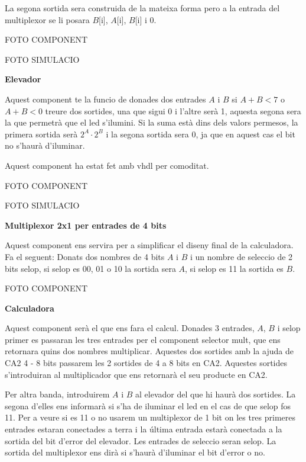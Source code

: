 \documentclass[12pt, a4papre]{article}
\begin{document}
	La segona sortida sera construida de la mateixa forma pero a la entrada del multiplexor se li posara $B$[i], $A$[i], $B$[i] i 0.
	
	\begin{center}
		FOTO COMPONENT
		
		FOTO SIMULACIO
	\end{center}
	
	\textbf{\large{Elevador}}
	
	Aquest component te la funcio de donades dos entrades $A$ i $B$ si $A + B < 7$ o $A + B  < 0$ treure dos sortides, una que sigui 0 i l'altre serà 1, aquesta segona sera la que permetrà que el led s'ilumini. Si la suma està dins dels valors permesos, la primera sortida serà $2^A\cdot2^B$ i la segona sortida sera 0, ja que en aquest cas el bit no s'haurà d'iluminar.
	
	Aquest component ha estat fet amb vhdl per comoditat.
	
	\begin{center}
		FOTO COMPONENT
		
		FOTO SIMULACIO
	\end{center}
	
	\textbf{\large{Multiplexor 2x1 per entrades de 4 bits}}
	
	Aquest component ens servira per a simplificar el diseny final de la calculadora. Fa el seguent: Donats dos nombres de 4 bits $A$ i $B$ i un nombre de seleccio de 2 bits selop, si selop es 00, 01 o 10 la sortida sera $A$, si selop es 11 la sortida es $B$.
	
	\begin{center}
		FOTO COMPONENT
	\end{center}
	
	\textbf{\large{Calculadora}}
	
	Aquest component serà el que ens fara el calcul. Donades 3 entrades, $A$, $B$ i selop primer es passaran les tres entrades per el component selector mult, que ens retornara quins dos nombres multiplicar. Aquestes dos sortides amb la ajuda de CA2 4 - 8 bits passarem les 2 sortides de 4 a 8 bits en CA2. Aquestes sortides s'introduiran al multiplicador que ens retornarà el seu producte en CA2. 
	
	Per altra banda, introduirem $A$ i $B$ al elevador del que hi haurà dos sortides. La segona d'elles ens informarà si s'ha de iluminar el led en el cas de que selop fos 11. Per a veure si es 11 o no usarem un multiplexor de 1 bit on les tres primeres entrades estaran conectades a terra i la última entrada estarà conectada a la sortida del bit d'error del elevador. Les entrades de seleccio seran selop. La sortida del multiplexor ens dirà si s'haurà d'iluminar el bit d'error o no.
	
\end{document}
